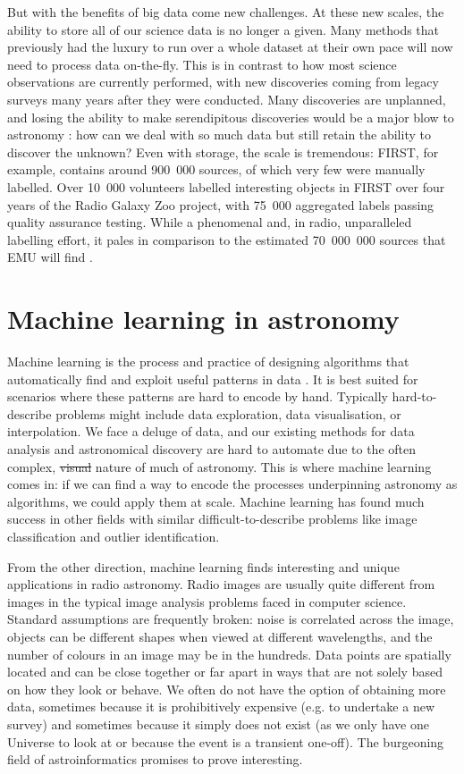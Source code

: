 \documentclass[11pt, a4paper]{book}
\providecommand{\DIFaddtex}[1]{{\protect\color{blue}\uwave{#1}}} %
\providecommand{\DIFdeltex}[1]{{\protect\color{red}\sout{#1}}}                      %
\providecommand{\DIFaddbegin}{} %
\providecommand{\DIFaddend}{} %
\providecommand{\DIFdelbegin}{} %
\providecommand{\DIFdelend}{} %
\providecommand{\DIFadd}[1]{\texorpdfstring{\DIFaddtex{#1}}{#1}} %
\providecommand{\DIFdel}[1]{\texorpdfstring{\DIFdeltex{#1}}{}} %
\newcommand{\DIFscaledelfig}{0.5}
\newlength{\DIFdelgraphicswidth} %
\newlength{\DIFdelgraphicsheight} %
\newcommand{\DIFaddincludegraphics}[2][]{{\color{blue}\fbox{\DIFOincludegraphics[#1]{#2}}}} %
\newcommand{\DIFdelincludegraphics}[2][]{%
\sbox{\DIFdelgraphicsbox}{\DIFOincludegraphics[#1]{#2}}%
\settoboxwidth{\DIFdelgraphicswidth}{\DIFdelgraphicsbox} %
\settoboxtotalheight{\DIFdelgraphicsheight}{\DIFdelgraphicsbox} %
\scalebox{\DIFscaledelfig}{%
\parbox[b]{\DIFdelgraphicswidth}{\usebox{\DIFdelgraphicsbox}\\[-\baselineskip] \rule{\DIFdelgraphicswidth}{0em}}\llap{\resizebox{\DIFdelgraphicswidth}{\DIFdelgraphicsheight}{%
\setlength{\unitlength}{\DIFdelgraphicswidth}%
\begin{picture}(1,1)%
\thicklines\linethickness{2pt} %
{\color[rgb]{1,0,0}\put(0,0){\framebox(1,1){}}}%
{\color[rgb]{1,0,0}\put(0,0){\line( 1,1){1}}}%
{\color[rgb]{1,0,0}\put(0,1){\line(1,-1){1}}}%
\end{picture}%
}\hspace*{3pt}}} %
} %
\DeclareRobustCommand{\DIFaddbegin}{\DIFOaddbegin \let\includegraphics\DIFaddincludegraphics} %
\DeclareRobustCommand{\DIFaddend}{\DIFOaddend \let\includegraphics\DIFOincludegraphics} %
\DeclareRobustCommand{\DIFdelbegin}{\DIFOdelbegin \let\includegraphics\DIFdelincludegraphics} %
\DeclareRobustCommand{\DIFdelend}{\DIFOaddend \let\includegraphics\DIFOincludegraphics} %
\begin{document}
    But with the benefits of big data come new challenges. At these new scales, the ability to store all of our science data is no longer a given. Many methods that previously had the luxury to run over a whole dataset at their own pace will now need to process data on-the-fly. This is in contrast to how most science observations are currently performed, with new discoveries coming from legacy surveys many years after they were conducted. Many discoveries are unplanned, and losing the ability to make serendipitous discoveries would be a major blow to astronomy \citep{norris17unexpected}: how can we deal with so much data but still retain the ability to discover the unknown? Even with storage, the scale is tremendous: FIRST, for example, contains around 900~000 sources, of which very few were manually labelled. Over 10~000 volunteers labelled interesting objects in FIRST over four years of the Radio Galaxy Zoo project, with 75~000 aggregated labels passing quality assurance testing. While a phenomenal and, in radio, unparalleled labelling effort, it pales in comparison to the estimated 70~000~000 sources that EMU will find \citep{banfield15}.

\section{Machine learning in astronomy}
\label{sec:ml-in-astro}

    Machine learning is the process and practice of designing algorithms that automatically find and exploit useful patterns in data \citep{deisenroth_mathematics_2020}. It is best suited for scenarios where these patterns are hard to encode by hand. Typically hard-to-describe problems might include data exploration, data visualisation, or interpolation. We face a deluge of data, and our existing methods for data analysis and astronomical discovery are hard to automate due to the often complex, \DIFdelbegin \DIFdel{visual }\DIFdelend \DIFaddbegin \DIFadd{imagery-based }\DIFaddend nature of much of astronomy. This is where machine learning comes in: if we can find a way to encode the processes underpinning astronomy as algorithms, we could apply them at scale. Machine learning has found much success in other fields with similar difficult-to-describe problems like image classification and outlier identification.

    From the other direction, machine learning finds interesting and unique applications in radio astronomy. Radio images are usually quite different from images in the typical image analysis problems faced in computer science. Standard assumptions are frequently broken: noise is correlated across the image, objects can be different shapes when viewed at different wavelengths, and the number of colours in an image may be in the hundreds. Data points are spatially located and can be close together or far apart in ways that are not solely based on how they look or behave. We often do not have the option of obtaining more data, sometimes because it is prohibitively expensive (e.g. to undertake a new survey) and sometimes because it simply does not exist (as we only have one Universe to look at or because the event is a transient one-off). The burgeoning field of astroinformatics promises to prove interesting.
\end{document}
